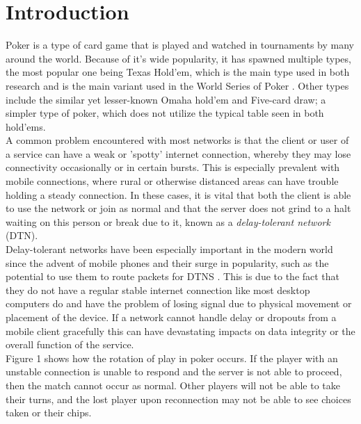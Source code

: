 \documentclass[11pt]{article}
\begin{document}
\tableofcontents



\newpage




\section{Introduction}
Poker is a type of card game that is played and watched in tournaments by many around the world. Because of it's wide popularity, it has spawned multiple types, the most popular one being Texas Hold'em, which is the main type used in both research \cite{research_texas} and is the main variant used in the World Series of Poker \cite{wsop_texas}. Other types include the similar yet lesser-known Omaha hold'em and Five-card draw; a simpler type of poker, which does not utilize the typical table seen in both hold'ems. \\

A common problem encountered with most networks is that the client or user of a service can have a weak or 'spotty' internet connection, whereby they may lose connectivity occasionally or in certain bursts. This is especially prevalent with mobile connections, where rural or otherwise distanced areas can have trouble holding a steady connection. In these cases, it is vital that both the client is able to use the network or join as normal and that the server does not grind to a halt waiting on this person or break due to it, known as a \textit{delay-tolerant network} (DTN). \\

Delay-tolerant networks have been especially important in the modern world since the advent of mobile phones and their surge in popularity, such as the potential to use them to route packets for DTNS \cite{manet}. This is due to the fact that they do not have a regular stable internet connection like most desktop computers do and have the problem of losing signal due to physical movement or placement of the device. If a network cannot handle delay or dropouts from a mobile client gracefully this can have devastating impacts on data integrity or the overall function of the service. \\

Figure 1 shows how the rotation of play in poker occurs. If the player with an unstable connection is unable to respond and the server is not able to proceed, then the match cannot occur as normal. Other players will not be able to take their turns, and the lost player upon reconnection may not be able to see choices taken or their chips.
\end{document}
